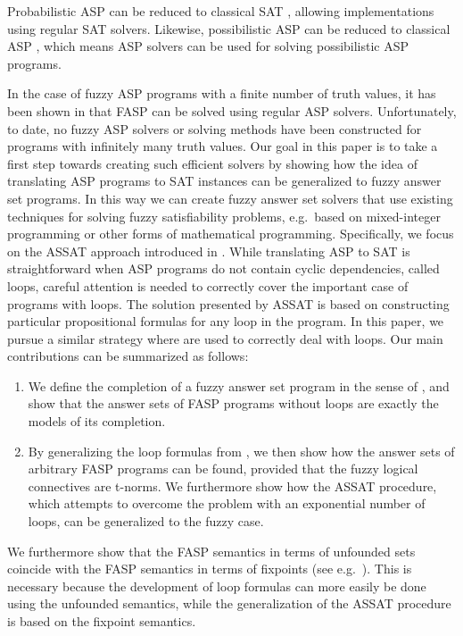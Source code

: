 \documentclass{tlp}
\begin{document}
Probabilistic ASP can be reduced to classical SAT \cite{Saad:ECSQARU2009}, allowing implementations using regular SAT solvers. Likewise, possibilistic ASP can be reduced to classical ASP \cite{Nicolas:AMAI2006}, which means ASP solvers can be used for solving possibilistic ASP programs. 

In the case of fuzzy ASP programs with a finite number of truth values, it has been shown in \cite{fasp1} that FASP can be solved using regular ASP solvers. Unfortunately, to date, no fuzzy ASP solvers or solving methods have been constructed for programs with infinitely many truth values. Our goal in this paper is to take a first step towards creating such efficient solvers by showing how the idea of translating ASP programs to SAT instances can be generalized to fuzzy answer set programs. In this way we can create fuzzy answer set solvers that use existing techniques for solving fuzzy satisfiability problems, e.g.~based on mixed-integer programming or other forms of mathematical programming.
Specifically, we focus on the ASSAT approach introduced in \cite{assat-linzhao}. While translating ASP to SAT is straightforward when ASP programs do not contain cyclic dependencies, called loops, careful attention is needed to correctly cover the important case of programs with loops. The solution presented by ASSAT is based on constructing particular propositional formulas for any loop in the program. In this paper, we pursue a similar strategy where  are used to correctly deal with loops. Our main contributions can be summarized as follows:

\begin{enumerate}
 \item We define the completion of a fuzzy answer set program in the sense of \cite{FASP:amai}, and show that the answer sets of FASP programs without loops are exactly the models of its completion.
 \item By generalizing the loop formulas from \cite{assat-linzhao}, we then show how the answer sets of arbitrary FASP programs can be found, provided that the fuzzy logical connectives are t-norms. We furthermore show how the ASSAT procedure, which attempts to overcome the problem with an exponential number of loops, can be generalized to the fuzzy case.
\end{enumerate}

We furthermore show that the FASP semantics in terms of unfounded sets \cite{fasp1} coincide with the FASP semantics in terms of fixpoints (see e.g.~\cite{Luka06}). This is necessary because the development of loop formulas can more easily be done using the unfounded semantics, while the generalization of the ASSAT procedure is based on the fixpoint semantics.
\end{document}
